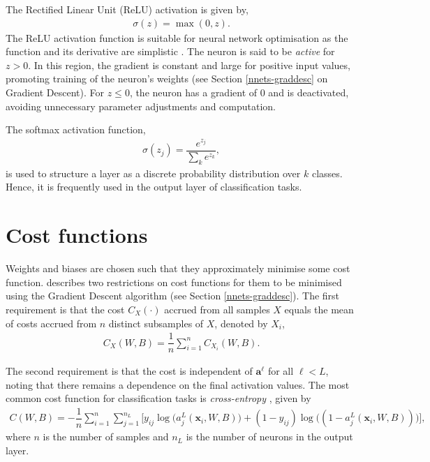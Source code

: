 The Rectified Linear Unit (ReLU) activation \citep{Maas2013} is given by,
\begin{align*}
	\sigma(z) = \max(0, z).
\end{align*}
The ReLU activation function is suitable for neural network optimisation as the function and its derivative are simplistic \citep{Goodfellow-et-al-2016}. The neuron is said to be \textit{active} for $z > 0$. In this region, the gradient is constant and large for positive input values, promoting training of the neuron's weights (see Section \ref{nnets-graddesc} on Gradient Descent). For $z \leq 0$, the neuron has a gradient of 0 and is deactivated, avoiding unnecessary parameter adjustments and computation. 

The softmax activation function,
\begin{align*}
	\sigma(z_j) = \dfrac{e^{z_j}}{\sum_ke^{z_k}},
\end{align*}
is used to structure a layer as a discrete probability distribution over $k$ classes. Hence, it is frequently used in the output layer of classification tasks.


\section{Cost functions}\label{nnets-cost}

Weights and biases are chosen such that they approximately minimise some cost function. \cite{Nielson2015} describes two restrictions on cost functions for them to be minimised using the Gradient Descent algorithm (see Section \ref{nnets-graddesc}). The first requirement is that the cost $C_X(\cdot)$ accrued from all samples $X$ equals the mean of costs accrued from $n$ distinct subsamples of $X$, denoted by $X_i$,
\begin{align*}
	C_X(W, B) = \dfrac{1}{n}\sum_{i=1}^n C_{X_i}(W,B).
\end{align*}

The second requirement is that the cost is independent of $\mathbf{a}^\ell$ for all $\ell < L$, noting that there remains a dependence on the final activation values. The most common cost function for classification tasks is \textit{cross-entropy} \citep{Nielson2015}, given by
\begin{align}\label{nnets-cross-entropy-eq}
	C(W,B) = -\dfrac{1}{n}\sum_{i=1}^{n}\sum_{j=1}^{n_L}\big[y_{ij}\log\big(a_j^L(\mathbf{x}_i,W,B)\big) + (1 - y_{ij})\log\big( (1 - a_j^L(\mathbf{x}_i,W,B))\big)\big],
\end{align}
where $n$ is the number of samples and $n_L$ is the number of neurons in the output layer.

